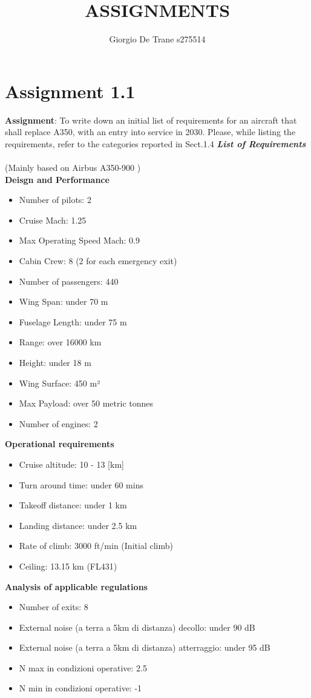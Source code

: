\documentclass{article}
\author{Giorgio De Trane s275514}
\title{ASSIGNMENTS}
\begin{document}
\maketitle
\tableofcontents
\pagebreak

\section{Assignment 1.1}

\textbf{Assignment}: To write down an initial list of requirements for an
aircraft that shall replace A350, with an entry into service in 2030.
Please, while listing the requirements, refer to the categories
reported in Sect.1.4
\newline
\newline
\textbf{\textit{List of Requirements}}\\\\ (Mainly based on Airbus A350-900 \autocite*{Airbus_A350-900})
\\ 

\textbf{Deisgn and Performance}
\begin{itemize}
    \item Number of pilots: 2
    \item Cruise Mach: 1.25
    \item Max Operating Speed Mach: 0.9
    \item Cabin Crew: 8 (2 for each emergency exit)
    \item Number of passengers: 440
    \item Wing Span: under 70 m
    \item Fuselage Length: under 75 m
    \item Range: over 16000 km
    \item Height: under 18 m
    \item Wing Surface: 450 m²
    \item Max Payload: over 50 metric tonnes
    \item Number of engines: 2
\end{itemize}
\pagebreak
\textbf{Operational requirements}
\begin{itemize}
    \item Cruise altitude: 10 - 13 [km]
    \item Turn around time: under 60 mins
    \item Takeoff distance: under 1 km
    \item Landing distance: under 2.5 km
    \item Rate of climb: 3000 ft/min (Initial climb)
    \item Ceiling: 13.15 km (FL431)
\end{itemize}
\textbf{Analysis of applicable regulations}
\begin{itemize}
    \item Number of exits: 8
    \item External noise (a terra a 5km di distanza) decollo: under 90 dB
    \item External noise (a terra a 5km di distanza) atterraggio: under 95 dB
    \item N max in condizioni operative: 2.5
    \item N min in condizioni operative: -1
\end{itemize}
\pagebreak
\end{document}
